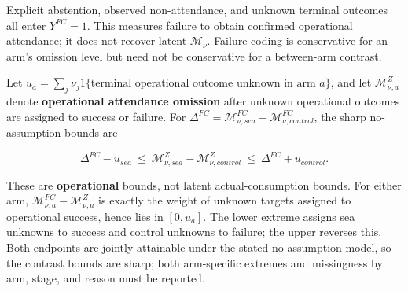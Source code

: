 \documentclass[
  11pt]{article}
\begin{document}
Explicit abstention, observed non-attendance, and unknown terminal
outcomes all enter \(Y^{FC}=1\). This measures failure to obtain
confirmed operational attendance; it does not recover latent
\(\mathcal M_\nu\). Failure coding is conservative for an arm's omission
level but need not be conservative for a between-arm contrast.

Let
\(u_a=\sum_j\nu_j1\{\text{terminal operational outcome unknown in arm }a\}\),
and let \(\mathcal M_{\nu,a}^{Z}\) denote \textbf{operational attendance
omission} after unknown operational outcomes are assigned to success or
failure. For
\(\Delta^{FC}=\mathcal M^{FC}_{\nu,sea}-\mathcal M^{FC}_{\nu,control}\),
the sharp no-assumption bounds are

\[\Delta^{FC}-u_{sea}\ \le\ \mathcal M_{\nu,sea}^{Z}-\mathcal M_{\nu,control}^{Z}\ \le\ \Delta^{FC}+u_{control}.\tag{6}\]

These are \textbf{operational} bounds, not latent actual-consumption
bounds. For either arm, \(\mathcal M^{FC}_{\nu,a}-\mathcal M^Z_{\nu,a}\)
is exactly the weight of unknown targets assigned to operational
success, hence lies in \([0,u_a]\). The lower extreme assigns sea
unknowns to success and control unknowns to failure; the upper reverses
this. Both endpoints are jointly attainable under the stated
no-assumption model, so the contrast bounds are sharp; both arm-specific
extremes and missingness by arm, stage, and reason must be reported.
\end{document}
